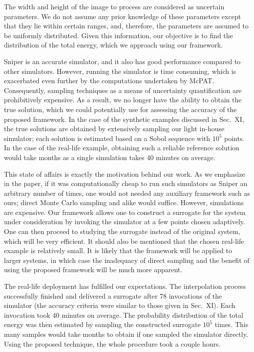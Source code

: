 \begin{authors}
The width and height of the image to process are considered as uncertain
parameters. We do not assume any prior knowledge of these parameters except that
they lie within certain ranges, and, therefore, the parameters are assumed to be
uniformly distributed. Given this information, our objective is to find the
distribution of the total energy, which we approach using our framework.

Sniper is an accurate simulator, and it also has good performance compared to
other simulators. However, running the simulator is time consuming, which is
exacerbated even further by the computations undertaken by McPAT. Consequently,
sampling techniques as a means of uncertainty quantification are prohibitively
expensive. As a result, we no longer have the ability to obtain the true
solution, which we could potentially use for assessing the accuracy of the
proposed framework. In the case of the synthetic examples discussed in Sec.~XI,
the true solutions are obtained by extensively sampling our light in-house
simulator; each solution is estimated based on a Sobol sequence with $10^5$
points. In the case of the real-life example, obtaining such a reliable
reference solution would take months as a single simulation takes 40 minutes on
average.

This state of affairs is exactly the motivation behind our work. As we emphasize
in the paper, if it was computationally cheap to run such simulators as Sniper
an arbitrary number of times, one would not needed any auxiliary framework such
as ours; direct Monte Carlo sampling and alike would suffice. However,
simulations are expensive. Our framework allows one to construct a surrogate for
the system under consideration by invoking the simulator at a few points chosen
adaptively. One can then proceed to studying the surrogate instead of the
original system, which will be very efficient. It should also be mentioned that
the chosen real-life example is relatively small. It is likely that the
framework will be applied to larger systems, in which case the inadequacy of
direct sampling and the benefit of using the proposed framework will be much
more apparent.

The real-life deployment has fulfilled our expectations. The interpolation
process successfully finished and delivered a surrogate after 78 invocations of
the simulator (the accuracy criteria were similar to those given in Sec.~XI).
Each invocation took 40 minutes on average. The probability distribution of the
total energy was then estimated by sampling the constructed surrogate $10^5$
times. This many samples would take months to obtain if one sampled the
simulator directly. Using the proposed technique, the whole procedure took a
couple hours.


\end{authors}
